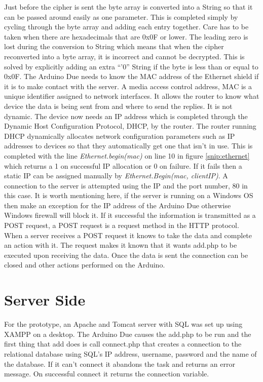  Just before the cipher is sent the byte array is converted into a String so that it can be passed around easily as one parameter. This is completed simply by cycling through the byte array and adding each entry together. Care has to be taken when there are hexadecimals that are 0x0F or lower. The leading zero is lost during the conversion to String which means that when the cipher reconverted into a byte array, it is incorrect and cannot be decrypted. This is solved by explicitly adding an extra ``'0'' String if the byte is less than or equal to 0x0F. The Arduino Due needs to know the MAC address of the Ethernet shield if it is to make contact with the server. A media access control address, MAC is a unique identifier assigned to network interfaces. It allows the router to know what device the data is being sent from and where to send the replies. It is not dynamic. The device now needs an IP address which is completed through the Dynamic Host Configuration Protocol, DHCP, by the router. The router running DHCP dynamically allocates network configuration parameters such as IP addresses to devices so that they automatically get one that isn't in use. This is completed with the line \emph{Ethernet.begin(mac)} on line 10 in figure \ref{snip:ethernet} which returns a 1 on successful IP allocation or 0 on failure. If it fails then a static IP can be assigned manually by \emph{Ethernet.Begin(mac, clientIP)}. A connection to the server is attempted using the IP and the port number, 80 in this case. It is worth mentioning here, if the server is running on a Windows OS then make an exception for the IP address of the Arduino Due otherwise Windows firewall will block it. If it successful the information is transmitted as a POST request, a POST request is a request method in the HTTP protocol. When a server receives a POST request it knows to take the data and complete an action with it. The request makes it known that it wants add.php to be executed upon receiving the data. %
Once the data is sent the connection can be closed and other actions performed on the Arduino.
 
\section{Server Side}

For the prototype, an Apache and Tomcat server with SQL was set up using XAMPP on a desktop. The Arduino Due causes the add.php to be run and the first thing that add does is call connect.php that creates a connection to the relational database using SQL's IP address, username, password and the name of the database. If it can't connect it abandons the task and returns an error message. On successful connect it returns the connection variable.

